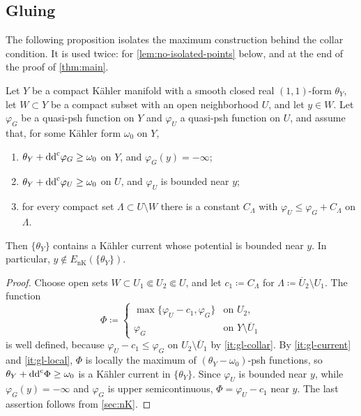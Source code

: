\documentclass[11pt,a4paper]{amsart}
\newcommand{\EnK}{E_{\mathrm{nK}}}
\theoremstyle{definition}
\begin{document}
\subsection{Gluing}

The following proposition isolates the maximum construction behind the
collar condition. It is used twice: for \cref{lem:no-isolated-points}
below, and at the end of the proof of \cref{thm:main}.

\begin{proposition}\label{prop:gluing}
Let $Y$ be a compact K\"ahler manifold with a smooth closed real
$(1,1)$-form $\theta_Y$, let $W\subset Y$ be a compact subset with an
open neighborhood $U$, and let $y\in W$. Let $\varphi_G$ be a quasi-psh
function on $Y$ and $\varphi_U$ a quasi-psh function on $U$, and assume
that, for some K\"ahler form $\omega_0$ on $Y$,
\begin{enumerate}[label=\textup{(\roman*)},leftmargin=*,itemsep=.25em]
\item\label{it:gl-current}
  $\theta_Y+\mathrm{dd}^{\mathrm{c}}\varphi_G\ge\omega_0$ on $Y$, and $\varphi_G(y)=-\infty$;
\item\label{it:gl-local}
  $\theta_Y+\mathrm{dd}^{\mathrm{c}}\varphi_U\ge\omega_0$ on $U$, and $\varphi_U$ is bounded
  near $y$;
\item\label{it:gl-collar} for every compact set $\Lambda\subset U\setminus W$
  there is a constant $C_\Lambda$ with $\varphi_U\le\varphi_G+C_\Lambda$
  on $\Lambda$.
\end{enumerate}
Then $\{\theta_Y\}$ contains a K\"ahler current whose potential is bounded
near $y$. In particular, $y\notin\EnK(\{\theta_Y\})$.
\end{proposition}

\begin{proof}
Choose open sets $W\subset U_1\Subset U_2\Subset U$, and let
$c_1\coloneqq C_\Lambda$ for $\Lambda\coloneqq\overline U_2\setminus U_1$. The
function
\[
  \Phi\coloneqq
  \begin{cases}
    \max\{\varphi_U-c_1,\varphi_G\}&\text{on }U_2,\\
    \varphi_G&\text{on }Y\setminus\overline U_1
  \end{cases}
\]
is well defined, because $\varphi_U-c_1\le\varphi_G$ on
$U_2\setminus\overline U_1$ by \ref{it:gl-collar}. By
\ref{it:gl-current} and \ref{it:gl-local}, $\Phi$ is locally the maximum
of $(\theta_Y-\omega_0)$-psh functions, so
$\theta_Y+\mathrm{dd}^{\mathrm{c}}\Phi\ge\omega_0$ is a K\"ahler current in $\{\theta_Y\}$.
Since $\varphi_U$ is bounded near $y$, while $\varphi_G(y)=-\infty$ and
$\varphi_G$ is upper semicontinuous, $\Phi=\varphi_U-c_1$ near $y$. The last
assertion follows from \cref{sec:nK}.
\end{proof}
\end{document}
